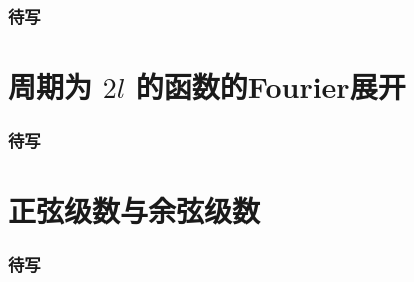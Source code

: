 \begin{frame}
\frametitle{待写}

\end{frame}


\section{周期为 $2l$ 的函数的Fourier展开}


\begin{frame}
\frametitle{待写}

\end{frame}


\section{正弦级数与余弦级数}


\begin{frame}
\frametitle{待写}

\end{frame}




